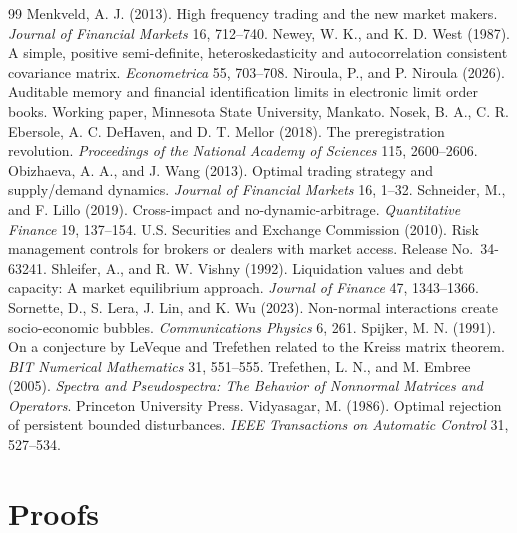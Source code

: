 \documentclass[12pt]{article}
\theoremstyle{definition}
\theoremstyle{remark}
\begin{document}
\begin{thebibliography}{99}
 Menkveld, A. J. (2013). High frequency trading and the new market makers. \emph{Journal of Financial Markets} 16, 712--740.
 Newey, W. K., and K. D. West (1987). A simple, positive semi-definite, heteroskedasticity and autocorrelation consistent covariance matrix. \emph{Econometrica} 55, 703--708.
 Niroula, P., and P. Niroula (2026). Auditable memory and financial identification limits in electronic limit order books. Working paper, Minnesota State University, Mankato.
 Nosek, B. A., C. R. Ebersole, A. C. DeHaven, and D. T. Mellor (2018). The preregistration revolution. \emph{Proceedings of the National Academy of Sciences} 115, 2600--2606.
 Obizhaeva, A. A., and J. Wang (2013). Optimal trading strategy and supply/demand dynamics. \emph{Journal of Financial Markets} 16, 1--32.
 Schneider, M., and F. Lillo (2019). Cross-impact and no-dynamic-arbitrage. \emph{Quantitative Finance} 19, 137--154.
 U.S. Securities and Exchange Commission (2010). Risk management controls for brokers or dealers with market access. Release No.\ 34-63241.
 Shleifer, A., and R. W. Vishny (1992). Liquidation values and debt capacity: A market equilibrium approach. \emph{Journal of Finance} 47, 1343--1366.
 Sornette, D., S. Lera, J. Lin, and K. Wu (2023). Non-normal interactions create socio-economic bubbles. \emph{Communications Physics} 6, 261.
 Spijker, M. N. (1991). On a conjecture by LeVeque and Trefethen related to the Kreiss matrix theorem. \emph{BIT Numerical Mathematics} 31, 551--555.
 Trefethen, L. N., and M. Embree (2005). \emph{Spectra and Pseudospectra: The Behavior of Nonnormal Matrices and Operators}. Princeton University Press.
 Vidyasagar, M. (1986). Optimal rejection of persistent bounded disturbances. \emph{IEEE Transactions on Automatic Control} 31, 527--534.
\end{thebibliography}

\appendix
\section{Proofs}\label{app:proofs}
\end{document}
